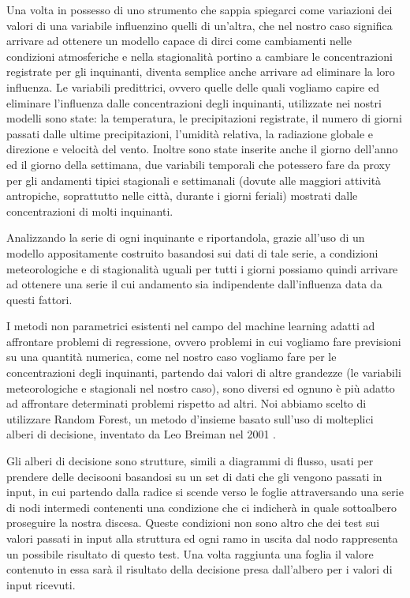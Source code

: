 \documentclass[a4paper,12pt]{report}
\begin{document}
Una volta in possesso di uno strumento che sappia spiegarci come variazioni dei valori di una variabile influenzino quelli di un'altra, che nel nostro caso significa arrivare ad ottenere un modello capace di dirci come cambiamenti nelle condizioni atmosferiche e nella stagionalità portino a cambiare le concentrazioni registrate per gli inquinanti, diventa semplice anche arrivare ad eliminare la loro influenza. Le variabili predittrici, ovvero quelle delle quali vogliamo capire ed eliminare l'influenza dalle concentrazioni degli inquinanti, utilizzate nei nostri modelli sono state: la temperatura, le precipitazioni registrate, il numero di giorni passati dalle ultime precipitazioni, l'umidità relativa, la radiazione globale e direzione e velocità del vento. Inoltre sono state inserite anche il giorno dell'anno ed il giorno della settimana, due variabili temporali che potessero fare da proxy per gli andamenti tipici stagionali e settimanali (dovute alle maggiori attività antropiche, soprattutto nelle città, durante i giorni feriali) mostrati dalle concentrazioni di molti inquinanti. 

Analizzando la serie di ogni inquinante e riportandola, grazie all'uso di un modello appositamente costruito basandosi sui dati di tale serie, a condizioni meteorologiche e di stagionalità uguali per tutti i giorni possiamo quindi arrivare ad ottenere una serie il cui andamento sia indipendente dall'influenza data da questi fattori.

I metodi non parametrici esistenti nel campo del machine learning adatti ad affrontare problemi di regressione, ovvero problemi in cui vogliamo fare previsioni su una quantità numerica, come nel nostro caso vogliamo fare per le concentrazioni degli inquinanti, partendo dai valori di altre grandezze (le variabili meteorologiche e stagionali nel nostro caso), sono diversi ed ognuno è più adatto ad affrontare determinati problemi rispetto ad altri. Noi abbiamo scelto di utilizzare Random Forest, un metodo d'insieme basato sull'uso di molteplici alberi di decisione, inventato da Leo Breiman nel 2001 \cite{breiman2001random}.

Gli alberi di decisione sono strutture, simili a diagrammi di flusso, usati per prendere delle decisooni basandosi su un set di dati che gli vengono passati in input, in cui partendo dalla radice si scende verso le foglie attraversando una serie di nodi intermedi contenenti una condizione che ci indicherà in quale sottoalbero proseguire la nostra discesa. Queste condizioni non sono altro che dei test sui valori passati in input alla struttura ed ogni ramo in uscita dal nodo rappresenta un possibile risultato di questo test. Una volta raggiunta una foglia il valore contenuto in essa sarà il risultato della decisione presa dall'albero per i valori di input ricevuti.
\end{document}
